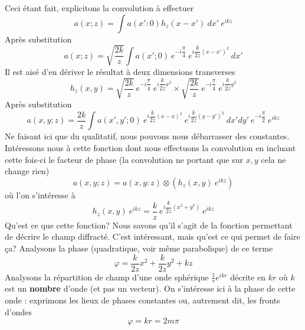 Ceci étant fait, explicitons la convolution à effectuer
\begin{equation}
a(x;z) = \int a(x':0)h_z(x-x')\ dx'\ e^{ikz}
\end{equation}
Après substitution
\begin{equation}
a(x;z) = \sqrt{\frac{2k}{z}}\int a(x';0) \ e^{-i\dfrac{\pi}{4}}\ e^{i\dfrac{k}{2z}(x-x')^2}\ 
dx'
\end{equation}
Il est aisé d'en dériver le résultat à deux dimensions transverses
\begin{equation}
h_z(x,y) = \sqrt{\frac{2k}{z}}\ e^{-i\dfrac{\pi}{4}}\ e^{i\dfrac{k}{2z}x^2} \times 
\sqrt{\frac{2k}{z}}\ e^{-i\dfrac{\pi}{4}}\ e^{i\dfrac{k}{2z}y^2}
\end{equation}
Après substitution
\begin{equation}
a(x,y;z) = \frac{2k}{z}\int a(x',y';0)\ e^{i\dfrac{k}{2z}(x-x)^2}\
 e^{i\dfrac{k}{2z}(y-y')^2}\ dx'dy'\ e^{-i\dfrac{\pi}{2}}\ e^{ikz}
\end{equation}
Ne faisant ici que du qualitatif, nous pouvons nous débarrasser des constantes. Intéressons
nous à cette fonction dont nous effectuons la convolution en incluant cette fois-ci le facteur 
de phase (la convolution ne portant que sur $x,y$ cela ne change rien)
\begin{equation}
a(x,y;z) = a(x,y:z)\otimes\left(h_z(x,y)\ e^{ikz}\right)
\end{equation}
où l'on s'intéresse à 
\begin{equation}
h_z(x,y)\ e^{ikz} = \frac{k}{z}\ e^{i\dfrac{k}{2z}(x^2+y^2)}\ e^{ikz}
\end{equation}
Qu'est ce que cette fonction? Nous savons qu'il s'agit de la fonction permettant de décrire 
le champ diffracté. C'est intéressant, mais qu'est ce qui permet de faire ça? Analysons la 
phase (quadratique, voir même parabolique) de ce terme
\begin{equation}
\varphi = \dfrac{k}{2z}x^2+\dfrac{k}{2z}y^2+kz
\end{equation}
Analysons la répartition de champ d'une onde sphérique $\frac{1}{r}e^{ikr}$ décrite en $kr$ 
où $k$ est un \textbf{nombre} d'onde (et pas un vecteur). On s'intéresse ici à la phase de 
cette onde : exprimons les lieux de phases constantes ou, autrement dit, les fronts d'ondes
\begin{equation}
\varphi = kr = 2m\pi
\end{equation}

